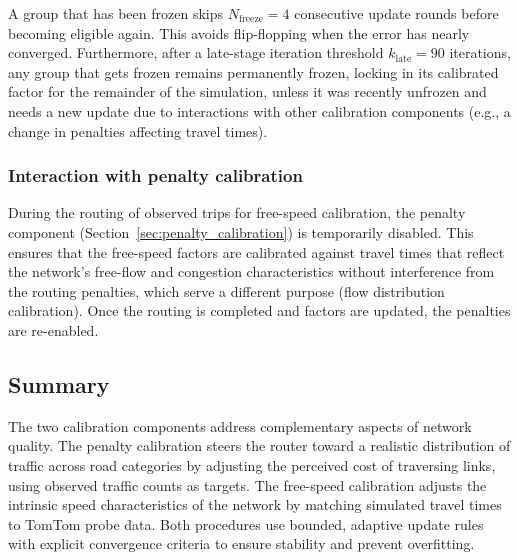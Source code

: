A group that has been frozen skips $N_{\text{freeze}} = 4$ consecutive update rounds before becoming eligible again. This avoids flip-flopping when the error has nearly converged. Furthermore, after a late-stage iteration threshold $k_{\text{late}} = 90$ iterations, any group that gets frozen remains permanently frozen, locking in its calibrated factor for the remainder of the simulation, unless it was recently unfrozen and needs a new update due to interactions with other calibration components (e.g., a change in penalties affecting travel times).

\subsubsection{Interaction with penalty calibration}

During the routing of observed trips for free-speed calibration, the penalty component (Section~\ref{sec:penalty_calibration}) is temporarily disabled. This ensures that the free-speed factors are calibrated against travel times that reflect the network's free-flow and congestion characteristics without interference from the routing penalties, which serve a different purpose (flow distribution calibration). Once the routing is completed and factors are updated, the penalties are re-enabled.

\subsection{Summary}

The two calibration components address complementary aspects of network quality. The penalty calibration steers the router toward a realistic distribution of traffic across road categories by adjusting the perceived cost of traversing links, using observed traffic counts as targets. The free-speed calibration adjusts the intrinsic speed characteristics of the network by matching simulated travel times to TomTom probe data. Both procedures use bounded, adaptive update rules with explicit convergence criteria to ensure stability and prevent overfitting.

